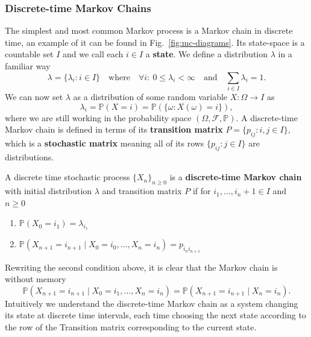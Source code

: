 \subsubsection{Discrete-time Markov Chains}
The simplest and most common Markov process is a Markov chain in discrete time, an example of it can be found in Fig.~\ref{fig:mc-diagrams}. Its state-space is a countable set $I$ and we call each $i \in I$ a \textbf{state}. We define a distribution $\lambda$ in a familiar way
\begin{equation}
	\lambda = \{\lambda_i : i \in I\} \quad \text{where} \quad \forall i:~ 0 \leq \lambda_i < \infty \quad \text{and} \quad \sum_{i \in I} \lambda_i = 1.
\end{equation}
We can now set $\lambda$ as a distribution of some random variable $X:\Omega \rightarrow I$ as
\begin{equation}
	\lambda_{i}=\mathbb{P}(X=i)=\mathbb{P}(\{\omega: X(\omega)=i\}),
\end{equation}
where we are still working in the probability space $(\Omega, \mathcal{F}, \mathbb{P})$. A discrete-time Markov chain is defined in terms of its \textbf{transition matrix} $P=\{p_{i j}: i, j \in I\}$, which is a \textbf{stochastic matrix} meaning all of its rows $\{p_{i j}: j \in I\}$ are distributions.
\begin{definition}
	A discrete time stochastic process $\{X_n\}_{n \geq 0}$ is a \textbf{discrete-time Markov chain} with initial distribution $\lambda$ and transition matrix $P$ if for $i_1, \dots, i_n+1 \in I$ and $n \geq 0$
	\begin{enumerate}[label=\roman*)]
		\item $\mathbb{P}\left(X_{0}=i_{1}\right)=\lambda_{i_{1}}$
		\item $\mathbb{P}\left(X_{n+1}=i_{n+1} \mid X_{0}=i_{0}, \dots, X_{n}=i_{n}\right)=p_{i_{n} i_{n+1}}$
	\end{enumerate}
\end{definition}
Rewriting the second condition above, it is clear that the Markov chain is without memory
\begin{equation}
	\mathbb{P}\left(X_{n+1}=i_{n+1} \mid X_{0}=i_{1}, \dots, X_{n}=i_{n}\right)=\mathbb{P}(X_{n+1} = i_{n+1} \mid X_{n} = i_{n}).
\end{equation}
Intuitively we understand the discrete-time Markov chain as a system changing its state at discrete time intervals, each time choosing the next state according to the row of the Transition matrix corresponding to the current state.

